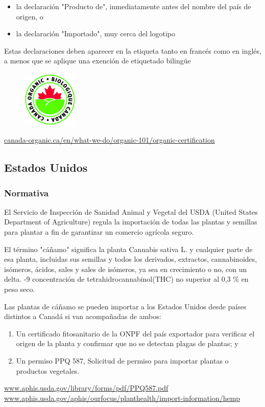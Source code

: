 \documentclass{article}
\begin{document}
\begin{itemize}
	\item la declaración "Producto de", inmediatamente antes del nombre del país de origen, o
	\item la declaración "Importado", muy cerca del logotipo
\end{itemize}

Estas declaraciones deben aparecer en la etiqueta tanto en francés como en inglés, a menos que se aplique una exención de etiquetado bilingüe

\begin{figure}[H]
	\includegraphics[width=100px]{res/ca-organic.jpg}
	\label{fig:caorgnic}
\end{figure}

\url{canada-organic.ca/en/what-we-do/organic-101/organic-certification}

\newpage

\subsection{Estados Unidos}

\subsubsection{Normativa}

El Servicio de Inspección de Sanidad Animal y Vegetal del USDA (United States Department of Agriculture) regula la importación de todas las plantas y semillas para plantar a fin de garantizar un comercio agrícola seguro.

El término "cáñamo" significa la planta Cannabis sativa L. y cualquier parte de esa planta, incluidas sus semillas y todos los derivados, extractos, cannabinoides, isómeros, ácidos, sales y sales de isómeros, ya sea en crecimiento o no, con un delta. -9 concentración de tetrahidrocannabinol(THC) no superior al 0,3 \% en peso seco.

Las plantas de cáñamo se pueden importar a los Estados Unidos desde países distintos a Canadá si van acompañadas de ambos:

\begin{enumerate}
	\item Un certificado fitosanitario de la ONPF del país exportador para verificar el origen de la planta y confirmar que no se detectan plagas de plantas; y
	\item Un permiso PPQ 587, Solicitud de permiso para importar plantas o productos vegetales.
\end{enumerate}
\url{www.aphis.usda.gov/library/forms/pdf/PPQ587.pdf}\\
\url{www.aphis.usda.gov/aphis/ourfocus/planthealth/import-information/hemp}
\end{document}
